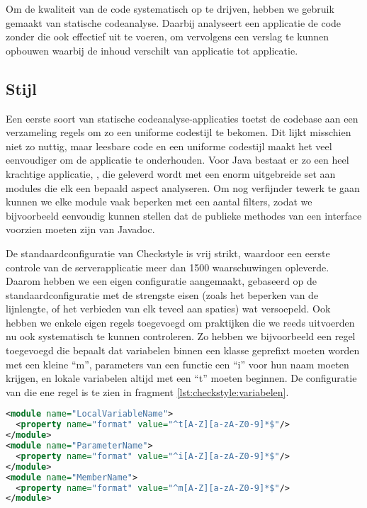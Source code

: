 Om de kwaliteit van de code systematisch op te drijven, hebben we gebruik gemaakt van statische codeanalyse. Daarbij analyseert een applicatie de code zonder die ook effectief uit te voeren, om vervolgens een verslag te kunnen opbouwen waarbij de inhoud verschilt van applicatie tot applicatie.

\subsection{Stijl}
\label{server:realisatie:codeanalyse:stijl}

Een eerste soort van statische codeanalyse-applicaties toetst de codebase aan een verzameling regels om zo een uniforme codestijl te bekomen. Dit lijkt misschien niet zo nuttig, maar leesbare code en een uniforme codestijl maakt het veel eenvoudiger om de applicatie te onderhouden.
Voor Java bestaat er zo een heel krachtige applicatie, , die geleverd wordt met een enorm uitgebreide set aan modules die elk een bepaald aspect analyseren. Om nog verfijnder tewerk te gaan kunnen we elke module vaak beperken met een aantal filters, zodat we bijvoorbeeld eenvoudig kunnen stellen dat de publieke methodes van een interface voorzien moeten zijn van Javadoc.

De standaardconfiguratie van Checkstyle is vrij strikt, waardoor een eerste controle van de serverapplicatie meer dan 1500 waarschuwingen opleverde. Daarom hebben we een eigen configuratie aangemaakt, gebaseerd op de standaardconfiguratie met de strengste eisen (zoals het beperken van de lijnlengte, of het verbieden van elk teveel aan spaties) wat versoepeld. Ook hebben we enkele eigen regels toegevoegd om praktijken die we reeds uitvoerden nu ook systematisch te kunnen controleren. Zo hebben we bijvoorbeeld een regel toegevoegd die bepaalt dat variabelen binnen een klasse geprefixt moeten worden met een kleine ``m'', parameters van een functie een ``i'' voor hun naam moeten krijgen, en lokale variabelen altijd met een ``t'' moeten beginnen. De configuratie van die ene regel is te zien in fragment \ref{lst:checkstyle:variabelen}.

\begin{lstlisting}[language=XML, float, caption="Checkstyle configuratie voor de naamgeving van variabelen., label=lst:checkstyle:variabelen]
<module name="LocalVariableName">
  <property name="format" value="^t[A-Z][a-zA-Z0-9]*$"/>
</module>
<module name="ParameterName">
  <property name="format" value="^i[A-Z][a-zA-Z0-9]*$"/>
</module>
<module name="MemberName">
  <property name="format" value="^m[A-Z][a-zA-Z0-9]*$"/>
</module>
\end{lstlisting}

